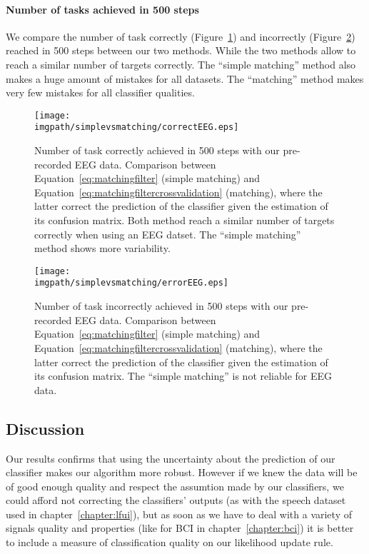 \paragraph{Number of tasks achieved in 500 steps}

We compare the number of task correctly (Figure~\ref{fig:nCorrect_simplevsmatchingEEG}) and incorrectly (Figure~\ref{fig:nWrongEEG_simplevsmatchingEEG}) reached in 500 steps between our two methods. While the two methods allow to reach a similar number of targets correctly. The ``simple matching'' method also makes a huge amount of mistakes for all datasets. The ``matching'' method makes very few mistakes for all classifier qualities.

\begin{figure}[!ht]
\centering
\texttt{[image: \\imgpath/simplevsmatching/correctEEG.eps]}
\caption{Number of task correctly achieved in 500 steps with our pre-recorded EEG data. Comparison between Equation~\ref{eq:matchingfilter} (simple matching) and Equation~\ref{eq:matchingfiltercrossvalidation} (matching), where the latter correct the prediction of the classifier given the estimation of its confusion matrix. Both method reach a similar number of targets correctly when using an EEG datset. The ``simple matching''  method shows more variability.}
\label{fig:nCorrect_simplevsmatchingEEG}
\end{figure} 

\begin{figure}[!ht]
\centering
\texttt{[image: \\imgpath/simplevsmatching/errorEEG.eps]}
\caption{Number of task incorrectly achieved in 500 steps with our pre-recorded EEG data. Comparison between Equation~\ref{eq:matchingfilter} (simple matching) and Equation~\ref{eq:matchingfiltercrossvalidation} (matching), where the latter correct the prediction of the classifier given the estimation of its confusion matrix. The ``simple matching'' is not reliable for EEG data.}
\label{fig:nWrongEEG_simplevsmatchingEEG}
\end{figure} 

\subsection{Discussion}

Our results confirms that using the uncertainty about the prediction of our classifier makes our algorithm more robust. However if we knew the data will be of good enough quality and respect the assumtion made by our classifiers, we could afford not correcting the classifiers' outputs (as with the speech dataset used in chapter~\ref{chapter:lfui}), but as soon as we have to deal with a variety of signals quality and properties (like for BCI in chapter~\ref{chapter:bci}) it is better to include a measure of classification quality on our likelihood update rule.